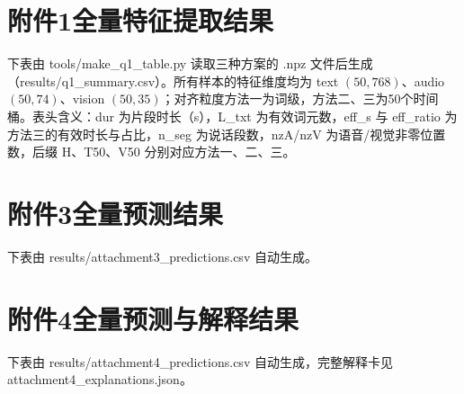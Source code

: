 \section{附件1全量特征提取结果}\label{app:q1}

下表由 tools/make\_q1\_table.py 读取三种方案的 .npz 文件后生成（results/q1\_summary.csv）。所有样本的特征维度均为 text $(50,768)$、audio $(50,74)$、vision $(50,35)$；对齐粒度方法一为词级，方法二、三为50个时间桶。表头含义：dur 为片段时长（s），L\_txt 为有效词元数，eff\_s 与 eff\_ratio 为方法三的有效时长与占比，n\_seg 为说话段数，nzA/nzV 为语音/视觉非零位置数，后缀 H、T50、V50 分别对应方法一、二、三。


\section{附件3全量预测结果}\label{app:att3}

下表由 results/attachment3\_predictions.csv 自动生成。


\section{附件4全量预测与解释结果}\label{app:att4}

下表由 results/attachment4\_predictions.csv 自动生成，完整解释卡见 attachment4\_explanations.json。

